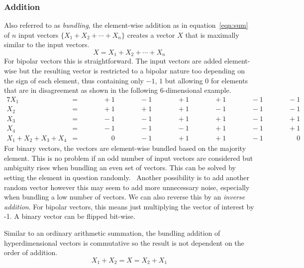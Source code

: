 \subsubsection{Addition} \label{sssec:add}
Also referred to as \textit{bundling}, the element-wise addition as in equation~\ref{eqn:sum} of $n$ input vectors $\{X_{1} + X_{2} + \cdots + X_{n}\}$ creates a vector $X$ that is maximally similar to the input vectors.
\begin{equation}
    \label{eqn:sum}
    X = X_{1} + X_{2} + \cdots + X_{n}
\end{equation}
For bipolar vectors this is straightforward. The input vectors are added element-wise but the resulting vector is restricted to a bipolar nature too depending on the sign of each element, thus containing only $-1$, $1$ but allowing $0$ for elements that are in disagreement as shown in the following $6$-dimensional example.
\begin{alignat*}{7}
    X_{1} &= && \qquad +1 && \qquad -1 && \qquad +1 && \qquad +1 && \qquad -1 && \qquad -1 \\
    X_{2} &= && \qquad +1 && \qquad +1 && \qquad +1 && \qquad -1 && \qquad -1 && \qquad -1 \\
    X_{3} &= && \qquad -1 && \qquad -1 && \qquad +1 && \qquad +1 && \qquad -1 && \qquad +1 \\
    X_{4} &= && \qquad -1 && \qquad -1 && \qquad -1 && \qquad +1 && \qquad -1 && \qquad +1 \\
    \hline
    X_{1} + X_{2} + X_{3} + X_{4} &= && \qquad \phantom{-}0 && \qquad -1 && \qquad +1 && \qquad +1 && \qquad -1 && \qquad \phantom{-}0
\end{alignat*}
For binary vectors, the vectors are element-wise bundled based on the majority element. This is no problem if an odd number of input vectors are considered but ambiguity rises when bundling an even set of vectors. This can be solved by setting the element in question randomly.~\cite{binBund} Another possibility is to add another random vector however this may seem to add more unnecessary noise, especially when bundling a low number of vectors. We can also reverse this by an \textit{inverse addition}. For bipolar vectors, this means just multiplying the vector of interest by -1. A binary vector can be flipped bit-wise.

Similar to an ordinary arithmetic summation, the bundling addition of hyperdimensional vectors is commutative so the result is not dependent on the order of addition.
\begin{equation}
    \label{eqn:sumcom}
    X_{1} + X_{2} = X = X_{2} + X_{1}
\end{equation}
